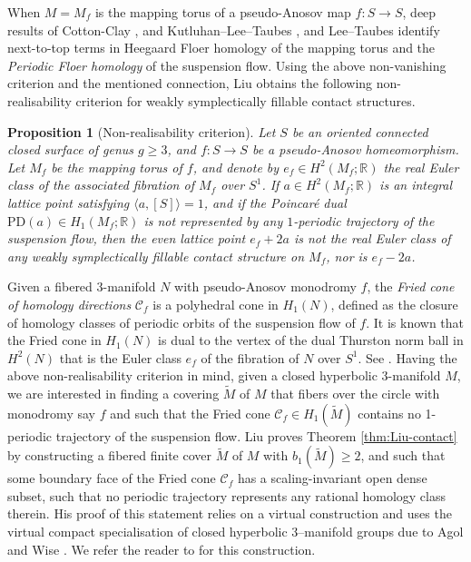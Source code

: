 \documentclass[11pt]{amsart}
\newtheorem{prop}[thm]{Proposition}
\theoremstyle{remark}
\theoremstyle{definition}
\begin{document}
	When $M= M_f$ is the mapping torus of a pseudo-Anosov map $f \colon S \rightarrow S$, deep results of Cotton-Clay \cite{cotton2009symplectic}, and Kutluhan--Lee--Taubes \cite{kutluhan2020hfI,kutluhan2020hfII,kutluhan2020hfIII,kutluhan2021hfIV,kutluhan2021hfV}, and Lee--Taubes \cite{lee2012periodic} identify next-to-top terms in Heegaard Floer homology of the mapping torus and the \emph{Periodic Floer homology} of the suspension flow. Using the above non-vanishing criterion and the mentioned connection, Liu \cite{liu2024euler} obtains the following non-realisability criterion for weakly symplectically fillable contact structures. 
	
	\begin{prop}[Non-realisability criterion]
		Let $S$ be an oriented connected closed surface of genus $g \geq 3$, and
	$f \colon S \rightarrow S$ be a pseudo-Anosov homeomorphism. Let $M_f$ be the mapping torus of $f$, and denote by $e_f \in H^2(M_f ; \mathbb{R})$ the real Euler class of the associated fibration of $M_f$ over $S^1$.	If $a \in H^2(M_f ; \mathbb{R})$ is an integral lattice point satisfying $\langle a , [S] \rangle =1$, and if the Poincar\'{e} dual $\mathrm{PD}(a) \in H_1(M_f ; \mathbb{R})$ is not represented by any $1$-periodic trajectory of the suspension flow, then the even lattice point $e_f + 2a$ is not the real Euler class of any weakly symplectically fillable contact structure on $M_f$, nor is $e_f - 2a$.
	\end{prop}

	Given a fibered 3-manifold $N$ with pseudo-Anosov monodromy $f$, the \emph{Fried cone of homology directions} $\mathcal{C}_f$ is a polyhedral cone in $H_1(N)$, defined as the closure of homology classes of periodic orbits of the suspension flow of $f$. It is known that the Fried cone in $H_1(N)$ is dual to the vertex of the dual Thurston norm ball in $H^2(N)$ that is the Euler class $e_f$ of the fibration of $N$ over $S^1$. See \cite{fried1979fibrations}. Having the above non-realisability criterion in mind, given a closed hyperbolic 3-manifold $M$, we are interested in finding a covering $\tilde{M}$ of $M$ that fibers over the circle with monodromy say $f$ and such that the Fried cone $\mathcal{C}_f \in H_1(\tilde{M})$ contains no 1-periodic trajectory of the suspension flow. Liu proves Theorem \ref{thm:Liu-contact} by constructing a fibered finite cover $\tilde{M}$ of $M$ with $b_1(\tilde{M}) \geq 2$, and such that some boundary face of the Fried cone $\mathcal{C}_f$ has a scaling-invariant open dense subset, such that no periodic trajectory represents any rational homology class therein. His proof of this statement relies on a virtual construction and uses the virtual compact specialisation of closed hyperbolic 3–manifold groups due to Agol \cite{agol2013virtual} and Wise \cite{wise2012riches}. We refer the reader to \cite{liu2024euler} for this construction. 
\end{document}
